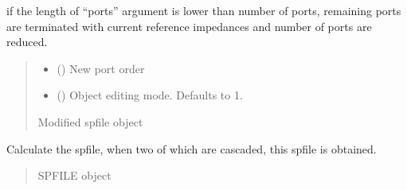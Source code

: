 \documentclass[letterpaper,10pt,english]{sphinxmanual}
\begin{document}
\begin{fulllineitems}
\begin{fulllineitems}
\sphinxAtStartPar
if the length of “ports” argument is lower than number of ports, remaining ports are terminated with current reference impedances and number of ports are reduced.
\begin{quote}\begin{description}
\begin{itemize}
\item {}
\sphinxAtStartPar
{} () \textendash{} New port order

\item {}
\sphinxAtStartPar
{} (\sphinxstyleliteralemphasis{\sphinxupquote{, }}) \textendash{} Object editing mode. Defaults to \sphinxhyphen{}1.

\end{itemize}

\sphinxAtStartPar
Modified spfile object

\sphinxAtStartPar
{\hyperref[\detokenize{touchstone:touchstone.spfile}]{}}

\end{description}\end{quote}

\end{fulllineitems}


\begin{fulllineitems}
\label{\detokenize{touchstone:touchstone.spfile.sqrt_network}}
\pysigstartsignatures
{}
\pysigstopsignatures
\sphinxAtStartPar
Calculate the spfile, when two of which are cascaded, this spfile is obtained.
\begin{quote}\begin{description}
\sphinxAtStartPar
SPFILE object

\sphinxAtStartPar
{\hyperref[\detokenize{touchstone:touchstone.spfile}]{}}

\end{description}\end{quote}


\end{fulllineitems}
\end{fulllineitems}
\end{document}
